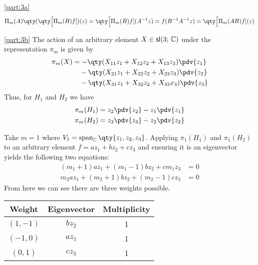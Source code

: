 \documentclass[
	pages,
	boxes,
	color=WildStrawberry
]{homework}
\begin{document}
\begin{solution}
	\ref{part:3a}
	\begin{equation*}
		\Pi_m(A)\qty(\qty\Big[\Pi_m(B)f])(z) = \qty\Big[\Pi_m(B)f](A^{-1}z) = f(B^{-1}A^{-1}z) = \qty\Big[\Pi_m(AB)f](z)
	\end{equation*}

	\ref{part:3b}
	The action of an arbitrary element $X\in\mathsf{sl}(3;\, \mathbb{C})$ under the representation $\pi_m$ is given by
	\begin{align*}
		\pi_m(X) & = -\qty(X_{11} z_1 + X_{12}z_2 + X_{13}z_3)\pdv{z_1}    \\
		         & \quad -\qty(X_{21}z_1 + X_{22}z_2 + X_{23}z_3)\pdv{z_2} \\
		         & \quad -\qty(X_{31}z_1 + X_{32}z_2 + X_{33}x_3)\pdv{z_3}
	\end{align*}
	Thus, for $H_1$ and $H_2$ we have
	\begin{align*}
		\pi_m(H_1) & = z_2\pdv{z_2} - z_1\pdv{z_1} \\
		\pi_m(H_2) & = z_3\pdv{z_3} - z_2\pdv{z_2}
	\end{align*}

	Take $m = 1$ where $V_1 = \vspan_\C\qty{z_1, z_2, z_3}$. Applying $\pi_1(H_1)$ and $\pi_1(H_2)$ to an arbitrary element $f = az_1 + bz_2 + cz_3$ and ensuring it is an eigenvector yields the following two equations:
	\begin{align*}
		(m_1 + 1)az_1 + (m_1 - 1)bz_2 + cm_1z_3 & = 0 \\
		m_2az_1 + (m_2 + 1)bz_2 + (m_2 - 1)cz_3 & = 0
	\end{align*}
	From here we can see there are three weights possible.
	\begin{table}[h]
		\centering\begin{tabular}{c c c}
			Weight    & Eigenvector & Multiplicity \\ \toprule
			$(1, -1)$ & $bz_2$      & 1            \\
			$(-1, 0)$ & $az_1$      & 1            \\
			$(0, 1)$  & $cz_3$      & 1
		\end{tabular}
	\end{table}


\end{solution}
\end{document}

